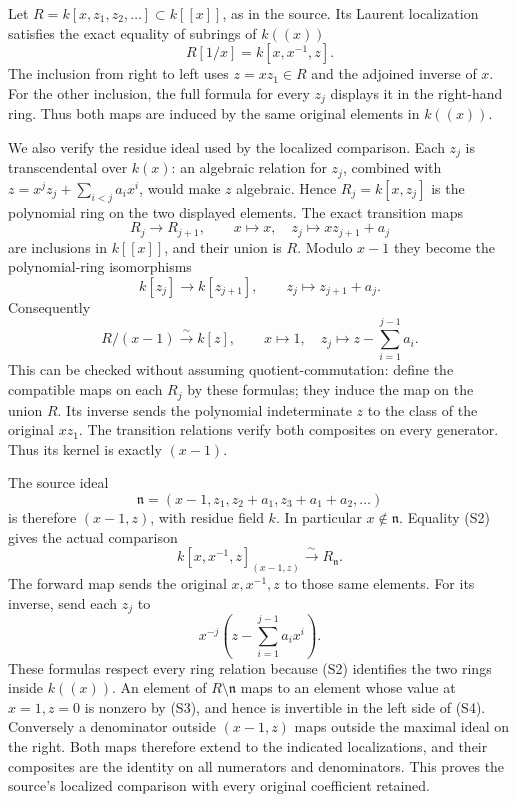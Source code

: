 \documentclass[11pt]{article}
\begin{document}
Let \(R=k[x,z_1,z_2,\ldots]\subset k[[x]]\), as in the source. Its Laurent localization satisfies the exact equality of subrings of \(k((x))\) \[
 R[1/x]=k[x,x^{-1},z].
\tag{S2}
\] The inclusion from right to left uses \(z=xz_1\in R\) and the adjoined inverse of \(x\). For the other inclusion, the full formula for every \(z_j\) displays it in the right-hand ring. Thus both maps are induced by the same original elements in \(k((x))\).

We also verify the residue ideal used by the localized comparison. Each \(z_j\) is transcendental over \(k(x)\): an algebraic relation for \(z_j\), combined with \(z=x^jz_j+\sum_{i<j}a_i x^i\), would make \(z\) algebraic. Hence \(R_j=k[x,z_j]\) is the polynomial ring on the two displayed elements. The exact transition maps \[
 R_j\longrightarrow R_{j+1},\qquad
 x\longmapsto x,\quad z_j\longmapsto xz_{j+1}+a_j
\] are inclusions in \(k[[x]]\), and their union is \(R\). Modulo \(x-1\) they become the polynomial-ring isomorphisms \[
 k[z_j]\longrightarrow k[z_{j+1}],\qquad
 z_j\longmapsto z_{j+1}+a_j.
\] Consequently \[
 R/(x-1)\xrightarrow{\sim}k[z],\qquad
 x\longmapsto1,\quad
 z_j\longmapsto z-\sum_{i=1}^{j-1}a_i.
\tag{S3}
\] This can be checked without assuming quotient-commutation: define the compatible maps on each \(R_j\) by these formulas; they induce the map on the union \(R\). Its inverse sends the polynomial indeterminate \(z\) to the class of the original \(xz_1\). The transition relations verify both composites on every generator. Thus its kernel is exactly \((x-1)\).

The source ideal \[
 \mathfrak n=(x-1,z_1,z_2+a_1,z_3+a_1+a_2,\ldots)
\] is therefore \((x-1,z)\), with residue field \(k\). In particular \(x\notin\mathfrak n\). Equality (S2) gives the actual comparison \[
 k[x,x^{-1},z]_{(x-1,z)}
 \xrightarrow{\sim} R_{\mathfrak n}.
\tag{S4}
\] The forward map sends the original \(x,x^{-1},z\) to those same elements. For its inverse, send each \(z_j\) to \[
 x^{-j}\left(z-\sum_{i=1}^{j-1}a_i x^i\right).
\] These formulas respect every ring relation because (S2) identifies the two rings inside \(k((x))\). An element of \(R\setminus\mathfrak n\) maps to an element whose value at \(x=1,z=0\) is nonzero by (S3), and hence is invertible in the left side of (S4). Conversely a denominator outside \((x-1,z)\) maps outside the maximal ideal on the right. Both maps therefore extend to the indicated localizations, and their composites are the identity on all numerators and denominators. This proves the source's localized comparison with every original coefficient retained.
\end{document}
